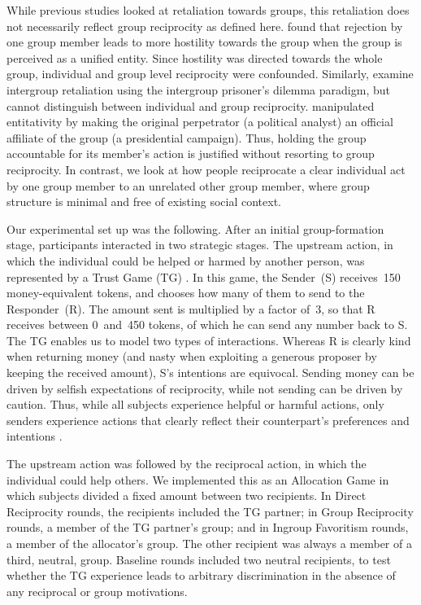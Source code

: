 \documentclass[12pt,a4paper]{article}\usepackage[]{graphicx}\usepackage[]{color}
\begin{document}

While previous studies looked at retaliation towards groups, this retaliation does not necessarily reflect group reciprocity as defined here. \citet{gaertner2008whenrejection} found that rejection by one group member leads to more hostility towards the group when the group is perceived as a unified entity. Since hostility was directed towards the whole group, individual and group level reciprocity were confounded. Similarly, \citet{bohm2016makes} examine intergroup retaliation using the intergroup prisoner's
dilemma paradigm, but cannot distinguish between individual and group reciprocity.
\citet{stenstrom2008theroles} manipulated entitativity by making the original perpetrator (a political analyst) an official affiliate of the group (a presidential campaign). Thus, holding the group accountable for its member's action is justified without resorting to group reciprocity. In contrast, we look at how people reciprocate a clear individual act by one group member to an unrelated other group member, where group structure is minimal and free of existing social context. 


Our experimental set up was the following. After an initial group-formation stage, participants interacted in two strategic stages. The upstream action, in which the individual could be helped  or harmed by another person, was represented by a Trust Game (TG) \citep{berg1995trust}.  In this game, the Sender~(S) receives~150 money-equivalent tokens, and chooses how many of them to send to the Responder~(R). The amount sent is multiplied by a factor of~3, so that R receives between 0~and~450 tokens, of which he can send any number back to S. The TG enables us to model two types of interactions. Whereas R is clearly kind when returning money (and nasty when exploiting a generous proposer by keeping the received amount), S's intentions are equivocal. Sending money can be driven by selfish expectations of reciprocity, while not sending can be driven by caution. Thus, while all subjects experience helpful or harmful actions, only senders experience actions that clearly reflect their counterpart's preferences and intentions \citep{gunnthorsdottir2002using,kimbrough2015norms}.

The upstream action was followed by the reciprocal action, 
in which the individual could help others. We implemented this as an Allocation
Game in which subjects divided a fixed amount between two recipients.
In Direct Reciprocity rounds, the recipients included the TG partner;
in Group Reciprocity rounds, a member of the TG partner's group; and
in Ingroup Favoritism rounds, a member of the allocator's group.
The other recipient was always a member of a third, neutral, group.
Baseline rounds included two neutral recipients, to test whether the
TG experience leads to arbitrary discrimination in the absence of any reciprocal
or group motivations.
\end{document}
